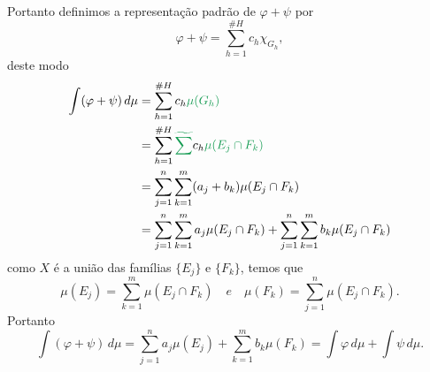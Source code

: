 \documentclass[a4paper, 11pt]{book}
\theoremstyle{definition}
\begin{document}
\begin{prf}
    Portanto definimos a representação padrão de $\varphi + \psi$ por
    \[
        \varphi + \psi = \sum_{h = 1}^{\# H} c_h \chi_{G_h},
    \]
    deste modo
    \[
        \begin{aligned}
            \int (\varphi + \psi) \, d\mu &= \sum_{h = 1}^{\# H} c_h \textcolor{ForestGreen}{\mu(G_h)}\\
            &= \sum_{h = 1}^{\# H} \textcolor{ForestGreen}{\widetilde{\sum}} c_h \textcolor{ForestGreen}{\mu (E_j \cap F_k)}\\
            &= \sum_{j = 1}^{n} \sum_{k = 1}^{m} (a_j + b_k) \mu(E_j \cap F_k)\\
            &= \sum_{j = 1}^{n} \sum_{k = 1}^{m} a_j \mu(E_j \cap F_k) + \sum_{j = 1}^{n} \sum_{k = 1}^{m} b_k \mu(E_j \cap F_k)
        \end{aligned}
    \]
    como $X$ é a união das famílias $\{E_j\}$ e $\{F_k\}$, temos que
    \[
        \mu(E_j) = \sum_{k = 1}^{m} \mu(E_j \cap F_k) \quad{ e } \quad \mu(F_k) = \sum_{j = 1}^{n} \mu(E_j \cap F_k).
    \]
    Portanto
    \[
        \int (\varphi + \psi) \, d\mu = \sum_{j = 1}^{n}  a_j \mu(E_j) + \sum_{k = 1}^{m}  b_k \mu(F_k) = \int \varphi \, d\mu + \int \psi \, d\mu.
    \]


\end{prf}
\end{document}
